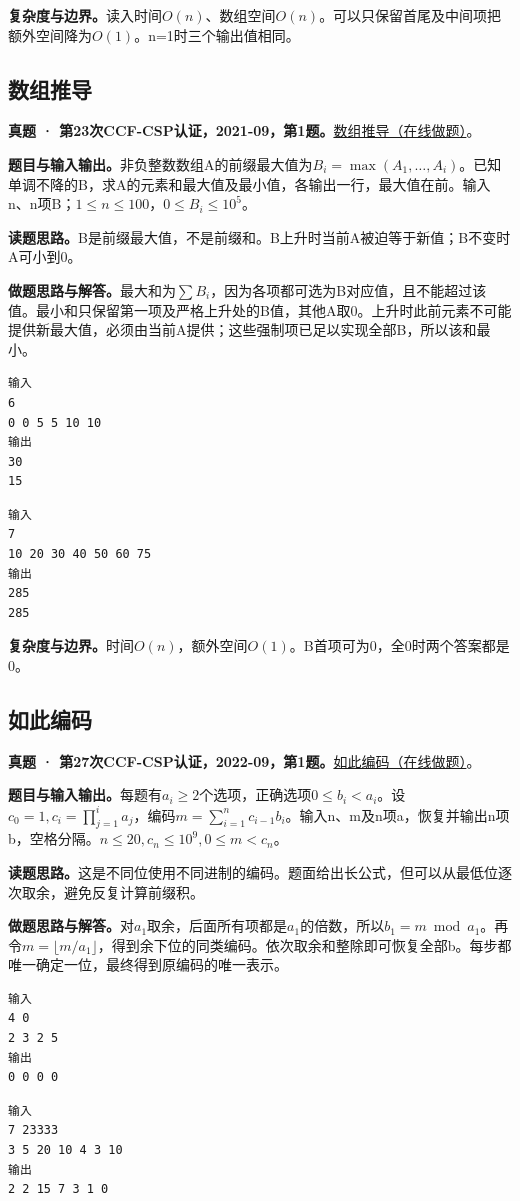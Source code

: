 \noindent\textbf{复杂度与边界。}读入时间$O(n)$、数组空间$O(n)$。可以只保留首尾及中间项把额外空间降为$O(1)$。n=1时三个输出值相同。
\subsection{数组推导}
\textbf{真题 · 第23次CCF-CSP认证，2021-09，第1题。}\href{https://www.acwing.com/problem/content/4009/}{数组推导（在线做题）}。

\noindent\textbf{题目与输入输出。}非负整数数组A的前缀最大值为$B_i=\max(A_1,\ldots,A_i)$。已知单调不降的B，求A的元素和最大值及最小值，各输出一行，最大值在前。输入n、n项B；$1\le n\le100$，$0\le B_i\le10^5$。

\noindent\textbf{读题思路。}B是前缀最大值，不是前缀和。B上升时当前A被迫等于新值；B不变时A可小到0。

\noindent\textbf{做题思路与解答。}最大和为$\sum B_i$，因为各项都可选为B对应值，且不能超过该值。最小和只保留第一项及严格上升处的B值，其他A取0。上升时此前元素不可能提供新最大值，必须由当前A提供；这些强制项已足以实现全部B，所以该和最小。
\begin{verbatim}
输入
6
0 0 5 5 10 10
输出
30
15
\end{verbatim}
\begin{verbatim}
输入
7
10 20 30 40 50 60 75
输出
285
285
\end{verbatim}

\noindent\textbf{复杂度与边界。}时间$O(n)$，额外空间$O(1)$。B首项可为0，全0时两个答案都是0。
\subsection{如此编码}
\textbf{真题 · 第27次CCF-CSP认证，2022-09，第1题。}\href{https://www.acwing.com/problem/content/4702/}{如此编码（在线做题）}。

\noindent\textbf{题目与输入输出。}每题有$a_i\ge2$个选项，正确选项$0\le b_i<a_i$。设$c_0=1,c_i=\prod_{j=1}^i a_j$，编码$m=\sum_{i=1}^n c_{i-1}b_i$。输入n、m及n项a，恢复并输出n项b，空格分隔。$n\le20,c_n\le10^9,0\le m<c_n$。

\noindent\textbf{读题思路。}这是不同位使用不同进制的编码。题面给出长公式，但可以从最低位逐次取余，避免反复计算前缀积。

\noindent\textbf{做题思路与解答。}对$a_1$取余，后面所有项都是$a_1$的倍数，所以$b_1=m\bmod a_1$。再令$m=\lfloor m/a_1\rfloor$，得到余下位的同类编码。依次取余和整除即可恢复全部b。每步都唯一确定一位，最终得到原编码的唯一表示。
\begin{verbatim}
输入
4 0
2 3 2 5
输出
0 0 0 0
\end{verbatim}
\begin{verbatim}
输入
7 23333
3 5 20 10 4 3 10
输出
2 2 15 7 3 1 0
\end{verbatim}

